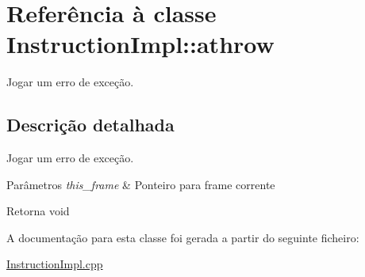 \hypertarget{class_instruction_impl_1_1athrow}{}\section{Referência à classe Instruction\+Impl\+:\+:athrow}
\label{class_instruction_impl_1_1athrow}


Jogar um erro de exceção.  




\subsection{Descrição detalhada}
Jogar um erro de exceção. 


\begin{DoxyParams}{Parâmetros}
{\em this\+\_\+frame} & Ponteiro para frame corrente \\
\hline
\end{DoxyParams}
\begin{DoxyReturn}{Retorna}
void 
\end{DoxyReturn}


A documentação para esta classe foi gerada a partir do seguinte ficheiro\+:\begin{DoxyCompactItemize}
\item 
\hyperlink{_instruction_impl_8cpp}{Instruction\+Impl.\+cpp}\end{DoxyCompactItemize}
